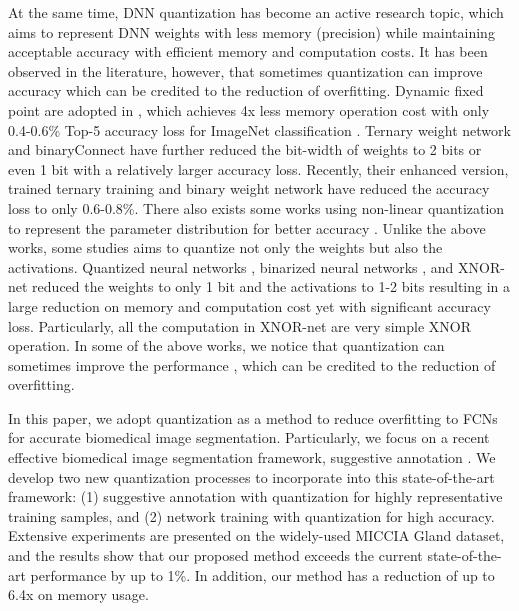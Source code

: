 \documentclass[10pt,twocolumn,letterpaper]{article}
\begin{document}
At the same time, DNN quantization has become an active research topic, which aims to represent DNN weights with less memory (precision) while maintaining acceptable accuracy with efficient memory and computation costs.
It has been observed in the literature, however, that sometimes quantization can improve accuracy which can be credited to the reduction of overfitting.
Dynamic fixed point are adopted in \cite{han2015deep}\cite{hubara2016quantized}, which achieves 4x less memory operation cost with only 0.4-0.6\% Top-5 accuracy loss for ImageNet classification \cite{deng2009imagenet}.
Ternary weight network \cite{li2016ternary} and binaryConnect \cite{courbariaux2015binaryconnect} have further reduced the bit-width of weights to 2 bits or even 1 bit with a relatively larger accuracy loss.
Recently, their enhanced version, trained ternary training \cite{zhu2016trained} and binary weight network \cite{rastegari2016xnor} have reduced the accuracy loss to only 0.6-0.8\%.
There also exists some works using non-linear quantization to represent the parameter distribution for better accuracy \cite{han2015deep}\cite{zhou2017incremental}.
Unlike the above works, some studies aims to quantize not only the weights but also the activations.
Quantized neural networks \cite{hubara2016quantized}, binarized neural networks \cite{courbariauxbinarynet}, and XNOR-net \cite{rastegari2016xnor} reduced the weights to only 1 bit and the activations to 1-2 bits resulting in a large reduction on memory and computation cost yet with significant accuracy loss.
Particularly, all the computation in XNOR-net are very simple XNOR operation.
In some of the above works, we notice that quantization can sometimes improve the performance \cite{han2015deep}\cite{zhou2017incremental}, which can be credited to the reduction of overfitting.

In this paper, we adopt quantization as a method to reduce overfitting to FCNs for accurate biomedical image segmentation.
Particularly, we focus on a recent effective biomedical image segmentation framework, suggestive annotation \cite{yang2017suggestive}.
We develop two new quantization processes to incorporate into this state-of-the-art framework: (1) suggestive annotation with quantization for highly representative training samples, and (2) network training with quantization for high accuracy.
Extensive experiments are presented on the widely-used MICCIA Gland dataset, and the results show that our proposed method exceeds the current state-of-the-art performance by up to 1\%.
In addition, our method has a reduction of up to 6.4x on memory usage.
\end{document}
